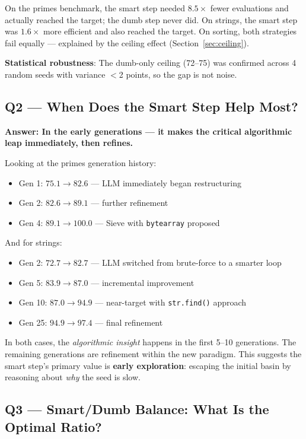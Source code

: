 \documentclass[11pt,a4paper]{article}
\begin{document}
On the primes benchmark, the smart step needed $8.5\times$ fewer evaluations
and actually reached the target; the dumb step never did.
On strings, the smart step was $1.6\times$ more efficient and also reached the target.
On sorting, both strategies fail equally — explained by the ceiling effect
(Section~\ref{sec:ceiling}).

\textbf{Statistical robustness}: The dumb-only ceiling (72--75) was confirmed
across 4 random seeds with variance $<$2 points, so the gap is not noise.

\subsection{Q2 — When Does the Smart Step Help Most?}
\label{sec:q2}

\textbf{Answer: In the early generations — it makes the critical algorithmic leap
immediately, then refines.}

Looking at the primes generation history:
\begin{itemize}
  \item Gen 1: $75.1 \to 82.6$ — LLM immediately began restructuring
  \item Gen 2: $82.6 \to 89.1$ — further refinement
  \item Gen 4: $89.1 \to 100.0$ — Sieve with \texttt{bytearray} proposed
\end{itemize}

And for strings:
\begin{itemize}
  \item Gen 2: $72.7 \to 82.7$ — LLM switched from brute-force to a smarter loop
  \item Gen 5: $83.9 \to 87.0$ — incremental improvement
  \item Gen 10: $87.0 \to 94.9$ — near-target with \texttt{str.find()} approach
  \item Gen 25: $94.9 \to 97.4$ — final refinement
\end{itemize}

In both cases, the \emph{algorithmic insight} happens in the first 5--10 generations.
The remaining generations are refinement within the new paradigm.
This suggests the smart step's primary value is \textbf{early exploration}:
escaping the initial basin by reasoning about \emph{why} the seed is slow.

\subsection{Q3 — Smart/Dumb Balance: What Is the Optimal Ratio?}
\label{sec:q3}
\end{document}
